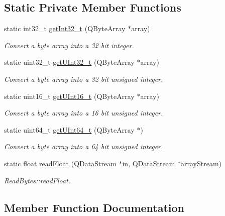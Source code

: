 \subsection*{Static Private Member Functions}
\begin{DoxyCompactItemize}
\item 
static int32\+\_\+t \hyperlink{class_read_file_a2d2e926ce5d4a347f11be0d77ce220a0}{get\+Int32\+\_\+t} (Q\+Byte\+Array $\ast$array)
\begin{DoxyCompactList}\small\item\em Convert a byte array into a 32 bit integer. \end{DoxyCompactList}\item 
static uint32\+\_\+t \hyperlink{class_read_file_a2eebe441e894e6ad4d79e05d3fc6f403}{get\+U\+Int32\+\_\+t} (Q\+Byte\+Array $\ast$array)
\begin{DoxyCompactList}\small\item\em Convert a byte array into a 32 bit unsigned integer. \end{DoxyCompactList}\item 
static uint16\+\_\+t \hyperlink{class_read_file_a4c16589205bf83c1cb2ca9e96cac7c1f}{get\+U\+Int16\+\_\+t} (Q\+Byte\+Array $\ast$array)
\begin{DoxyCompactList}\small\item\em Convert a byte array into a 16 bit unsigned integer. \end{DoxyCompactList}\item 
static uint64\+\_\+t \hyperlink{class_read_file_a7bbb10a200eabbc6c182ad8ba23c0ff5}{get\+U\+Int64\+\_\+t} (Q\+Byte\+Array $\ast$)
\begin{DoxyCompactList}\small\item\em Convert a byte array into a 64 bit unsigned integer. \end{DoxyCompactList}\item 
static float \hyperlink{class_read_file_aefd6a71c88d067556d5fcd856666d545}{read\+Float} (Q\+Data\+Stream $\ast$in, Q\+Data\+Stream $\ast$array\+Stream)
\begin{DoxyCompactList}\small\item\em Read\+Bytes\+::read\+Float. \end{DoxyCompactList}\end{DoxyCompactItemize}


\subsection{Member Function Documentation}
\mbox{\label{class_read_file_a2d2e926ce5d4a347f11be0d77ce220a0}} 
